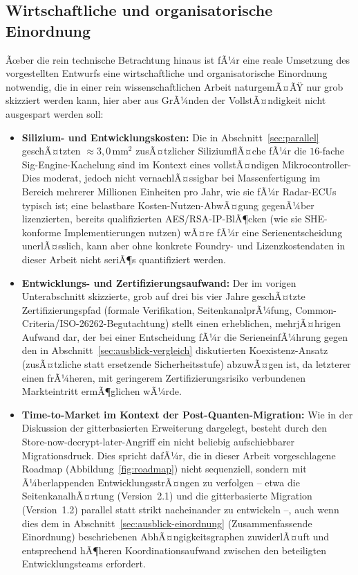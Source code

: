 ﻿\documentclass[a4paper,12pt]{article}
\theoremstyle{definition}
\begin{document}
\subsection{Wirtschaftliche und organisatorische Einordnung}

Ãœber die rein technische Betrachtung hinaus ist fÃ¼r eine reale Umsetzung des vorgestellten Entwurfs eine wirtschaftliche und organisatorische Einordnung notwendig, die in einer rein wissenschaftlichen Arbeit naturgemÃ¤ÃŸ nur grob skizziert werden kann, hier aber aus GrÃ¼nden der VollstÃ¤ndigkeit nicht ausgespart werden soll:

\begin{itemize}
	\item \textbf{Silizium- und Entwicklungskosten:} Die in Abschnitt~\ref{sec:parallel} geschÃ¤tzten $\approx 3{,}0\,\mathrm{mm}^2$ zusÃ¤tzlicher SiliziumflÃ¤che fÃ¼r die $16$-fache Sig-Engine-Kachelung sind im Kontext eines vollstÃ¤ndigen Mikrocontroller-Dies moderat, jedoch nicht vernachlÃ¤ssigbar bei Massenfertigung im Bereich mehrerer Millionen Einheiten pro Jahr, wie sie fÃ¼r Radar-ECUs typisch ist; eine belastbare Kosten-Nutzen-AbwÃ¤gung gegenÃ¼ber lizenzierten, bereits qualifizierten AES/RSA-IP-BlÃ¶cken (wie sie SHE-konforme Implementierungen nutzen) wÃ¤re fÃ¼r eine Serienentscheidung unerlÃ¤sslich, kann aber ohne konkrete Foundry- und Lizenzkostendaten in dieser Arbeit nicht seriÃ¶s quantifiziert werden.
	\item \textbf{Entwicklungs- und Zertifizierungsaufwand:} Der im vorigen Unterabschnitt skizzierte, grob auf drei bis vier Jahre geschÃ¤tzte Zertifizierungspfad (formale Verifikation, SeitenkanalprÃ¼fung, Common-Criteria/ISO-26262-Begutachtung) stellt einen erheblichen, mehrjÃ¤hrigen Aufwand dar, der bei einer Entscheidung fÃ¼r die SerieneinfÃ¼hrung gegen den in Abschnitt~\ref{sec:ausblick-vergleich} diskutierten Koexistenz-Ansatz (zusÃ¤tzliche statt ersetzende Sicherheitsstufe) abzuwÃ¤gen ist, da letzterer einen frÃ¼heren, mit geringerem Zertifizierungsrisiko verbundenen Markteintritt ermÃ¶glichen wÃ¼rde.
	\item \textbf{Time-to-Market im Kontext der Post-Quanten-Migration:} Wie in der Diskussion der gitterbasierten Erweiterung dargelegt, besteht durch den Store-now-decrypt-later-Angriff ein nicht beliebig aufschiebbarer Migrationsdruck. Dies spricht dafÃ¼r, die in dieser Arbeit vorgeschlagene Roadmap (Abbildung~\ref{fig:roadmap}) nicht sequenziell, sondern mit Ã¼berlappenden EntwicklungsstrÃ¤ngen zu verfolgen -- etwa die SeitenkanalhÃ¤rtung (Version~2.1) und die gitterbasierte Migration (Version~1.2) parallel statt strikt nacheinander zu entwickeln --, auch wenn dies dem in Abschnitt~\ref{sec:ausblick-einordnung} (Zusammenfassende Einordnung) beschriebenen AbhÃ¤ngigkeitsgraphen zuwiderlÃ¤uft und entsprechend hÃ¶heren Koordinationsaufwand zwischen den beteiligten Entwicklungsteams erfordert.

\end{itemize}
\end{document}
